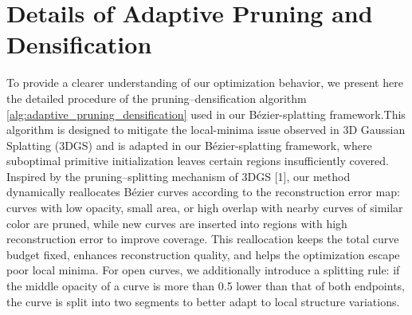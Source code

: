 
\section{Details of Adaptive Pruning and Densification}
To provide a clearer understanding of our optimization behavior, we present here the detailed procedure of the pruning–densification algorithm \ref{alg:adaptive_pruning_densification} used in our Bézier-splatting framework.This algorithm is designed to mitigate the local-minima issue observed in 3D Gaussian Splatting (3DGS) and is adapted in our Bézier-splatting framework, where suboptimal primitive initialization leaves certain regions insufficiently covered.
Inspired by the pruning–splitting mechanism of 3DGS [1], our method dynamically reallocates Bézier curves according to the reconstruction error map: curves with low opacity, small area, or high overlap with nearby curves of similar color are pruned, while new curves are inserted into regions with high reconstruction error to improve coverage.
This reallocation keeps the total curve budget fixed, enhances reconstruction quality, and helps the optimization escape poor local minima.
For open curves, we additionally introduce a splitting rule:
if the middle opacity of a curve is more than 0.5 lower than that of both endpoints, the curve is split into two segments to better adapt to local structure variations.


